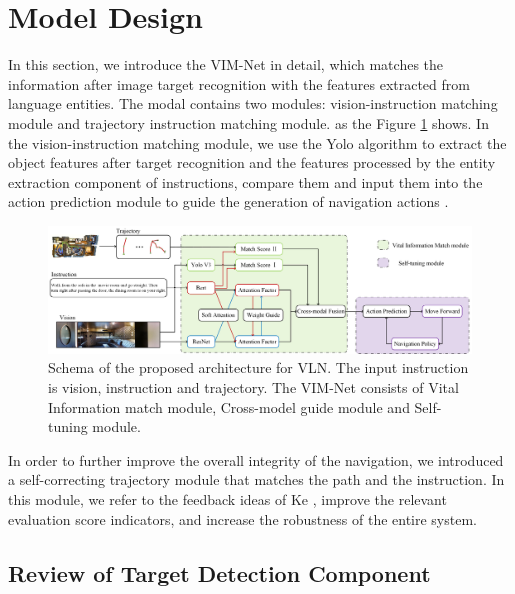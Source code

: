 \section{Model Design}
	
In this section, we introduce the VIM-Net in detail, which matches the information after image target recognition with the features extracted from language entities. The modal contains two modules: vision-instruction matching module and trajectory instruction matching module. as the Figure \ref{image03} shows. In the vision-instruction matching module, we use the Yolo algorithm to extract the object features after target recognition and the features processed by the entity extraction component of instructions, compare them and input them into the action prediction module to guide the generation of navigation actions \cite{redmon2016you}.

\begin{figure}[h]
	\centering
	\includegraphics[scale=1]{image03.png}
	\caption{Schema of the proposed architecture for VLN. The input instruction is vision, instruction and trajectory. The VIM-Net consists of Vital Information match module, Cross-model guide module and Self-tuning module.}
	\label{image03}
\end{figure}

In order to further improve the overall integrity of the navigation, we introduced a self-correcting trajectory module that matches the path and the instruction. In this module, we refer to the feedback ideas of Ke \cite{ke2019tactical}, improve the relevant evaluation score indicators, and increase the robustness of the entire system.

\subsection{Review of Target Detection Component}

